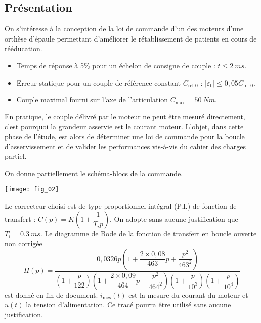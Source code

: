 \setcounter{exo}{0}
\begin{multicols}{2}


\subsection*{Présentation}
On s'intéresse à la conception de la loi de commande d'un des moteurs d'une orthèse d'épaule permettant d'améliorer le rétablissement de patients en cours de rééducation. 

\begin{obj}
\begin{itemize}
\item Temps de réponse à 5\% pour un échelon de consigne de couple : $t\leq \SI{2}{ms}$.
\item Erreur statique pour un couple de référence constant $C_{\text{ref 0}}$ : $|\varepsilon_0 |\leq 0,05 C_{\text{ref 0}}$.
\item Couple maximal fourni sur l’axe de l’articulation $C_{\text{max}} = \SI{50}{Nm}$.
\end{itemize}
\end{obj}

En pratique, le couple délivré par le moteur ne peut être mesuré directement, c’est pourquoi la grandeur
asservie est le courant moteur. L’objet, dans cette phase de l’étude, est alors de déterminer une loi de
commande pour la boucle d’asservissement et de valider les performances vis-à-vis du cahier des charges
partiel.

On donne partiellement le schéma-blocs de la commande. 

\begin{center}
\texttt{[image: fig\_02]}
\end{center}

Le correcteur choisi est de type proportionnel-intégral (P.I.) de fonction de transfert : $C(p)=K\left(1+\dfrac{1}{T_ip}\right)$. On adopte sans aucune justification que $T_i=\SI{0,3}{ms}$. 
Le diagramme de Bode de la fonction de transfert en boucle ouverte non corrigée 
\footnotesize
$$
H(p)=\dfrac{
0,0326 p \left( 1+\dfrac{2\times 0,08}{463}p+\dfrac{p^2}{463^2}\right)}
{
\left(1+\dfrac{p}{122} \right)
\left( 1+\dfrac{2\times 0,09}{464}p+\dfrac{p^2}{464^2}\right)
\left(1+\dfrac{p}{10^3} \right)
\left(1+\dfrac{p}{10^4} \right)
}
$$
\normalsize
est donné en fin de document. $i_{\text{mes}}(t)$ est la mesure du courant du moteur et $u(t)$ la tension d’alimentation. Ce tracé pourra être utilisé sans aucune justification.



\end{multicols}
